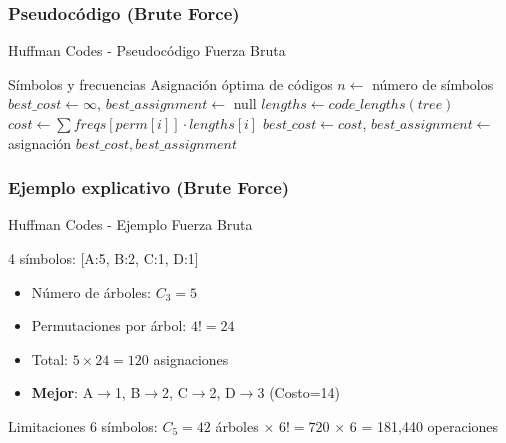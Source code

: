 \documentclass[aspectratio=169]{beamer}
\renewcommand{\algorithmicrequire}{\textbf{Entrada:}}
\renewcommand{\algorithmicensure}{\textbf{Salida:}}
\newcommand{\REQUIRE}{\State[\algorithmicrequire]}
\newcommand{\ENSURE}{\State[\algorithmicensure]}
\begin{document}
\subsubsection{Pseudocódigo (Brute Force)}
\begin{frame}[fragile]{Huffman Codes - Pseudocódigo Fuerza Bruta}
\begin{algorithmic}[1]
\REQUIRE Símbolos y frecuencias
\ENSURE Asignación óptima de códigos
\State $n \leftarrow$ número de símbolos
\State $best\_cost \leftarrow \infty$, $best\_assignment \leftarrow$ null
    \State $lengths \leftarrow code\_lengths(tree)$
        \State $cost \leftarrow \sum freqs[perm[i]] \cdot lengths[i]$
            \State $best\_cost \leftarrow cost$, $best\_assignment \leftarrow$ asignación
        \EndIf
    \EndFor
\EndFor
\Return $best\_cost, best\_assignment$
\end{algorithmic}
\end{frame}

\subsubsection{Ejemplo explicativo (Brute Force)}
\begin{frame}{Huffman Codes - Ejemplo Fuerza Bruta}
\begin{exampleblock}{4 símbolos: [A:5, B:2, C:1, D:1]}
\begin{itemize}
\item Número de árboles: $C_3 = 5$
\item Permutaciones por árbol: $4! = 24$
\item Total: $5 \times 24 = 120$ asignaciones
\item \textbf{Mejor}: A$\rightarrow$1, B$\rightarrow$2, C$\rightarrow$2, D$\rightarrow$3 (Costo=14)
\end{itemize}
\end{exampleblock}

\begin{alertblock}{Limitaciones}
6 símbolos: $C_5 = 42$ árboles $\times$ $6! = 720$ $\times$ 6 = 181,440 operaciones
\end{alertblock}
\end{frame}
\end{document}

